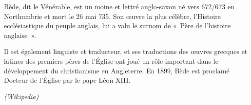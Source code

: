 Bède, dit le Vénérable, est un moine et lettré anglo-saxon né vers 672/673 en Northumbrie et mort le 26 mai 735. Son œuvre la plus célèbre, l'Histoire ecclésiastique du peuple anglais, lui a valu le surnom de «~Père de l'histoire anglaise~».\par
Il est également linguiste et traducteur, et ses traductions des œuvres grecques et latines des premiers pères de l'Église ont joué un rôle important dans le développement du christianisme en Angleterre. En 1899, Bède est proclamé Docteur de l'Église par le pape Léon XIII.\par
\emph{(Wikipedia)}
